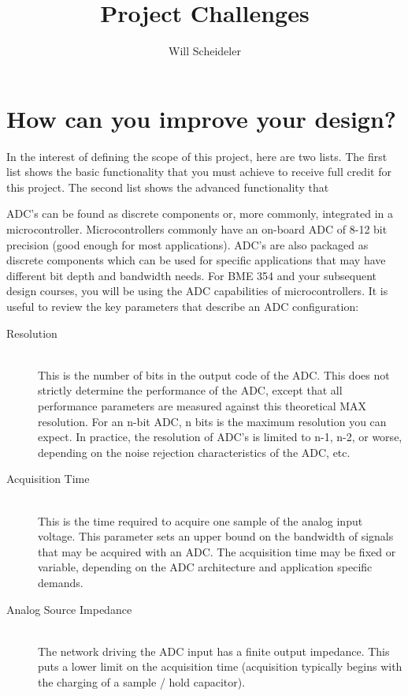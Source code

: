 \documentclass[10pt]{report}
\title{Project Challenges}
\author{Will Scheideler}
\begin{document}
\section*{How can you improve your design?}

\par
	In the interest of defining the scope of this project, here are two lists. The first list shows the basic functionality that you must achieve to receive full credit for this project. The second list shows the advanced functionality that 

\par
ADC’s can be found as discrete components or, more commonly, integrated in a microcontroller. Microcontrollers commonly have an on-board ADC of 8-12 bit precision (good enough for most applications). ADC’s are also packaged as discrete components which can be used for specific applications that may have different bit depth and bandwidth needs. For BME 354 and your subsequent design courses, you will be using the ADC capabilities of microcontrollers. It is useful to review the key parameters that describe an ADC configuration:

\begin{description}
  \item[Resolution] \hfill \\
  This is the number of bits in the output code of the ADC. This does not strictly determine the performance of the ADC, except that all performance parameters are measured against this theoretical MAX resolution. For an n-bit ADC, n bits is the maximum resolution you can expect. In practice, the resolution of ADC’s is limited to n-1, n-2, or worse, depending on the noise rejection characteristics of the ADC, etc.

  \item[Acquisition Time] \hfill \\
This is the time required to acquire one sample of the analog input voltage. This parameter sets an upper bound on the bandwidth of signals that may be acquired with an ADC. The acquisition time may be fixed or variable, depending on the ADC architecture and application specific demands.

  \item[Analog Source Impedance] \hfill \\
  The network driving the ADC input has a finite output impedance. This puts a lower limit on the acquisition time (acquisition typically begins with the charging of a sample / hold capacitor).
\end{description}
\end{document}
